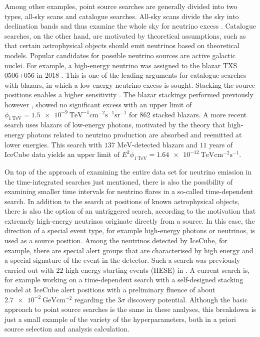 Among other examples, point source searches are generally divided into two types, all-sky scans and catalogue searches.
All-sky scans divide the sky into declination bands and thus examine the whole sky for neutrino excess \cite{all_sky_paper}.
Catalogue searches, on the other hand, are motivated by theoretical assumptions, such as that certain astrophysical objects should emit neutrinos based on theoretical models.
Popular candidates for possible neutrino sources are active galactic nuclei.
For example, a high-energy neutrino was assigned to the blazar TXS 0506+056 in 2018 \cite{txs}.
This is one of the leading arguments for catalogue searches with blazars, in which a low-energy neutrino excess is sought.
Stacking the source positions enables a higher sensitivity \cite{stacking_argument}.
The blazar stackings performed previously however \cite{blazar_stacking_2017}, showed no significant excess with an upper limit of $\phi_{\SI{1}{\tera\electronvolt}}=\SI{1.5e-9}{\tera\electronvolt\tothe{-1}\centi\meter\tothe{-2}\second\tothe{-1}\steradian\tothe{-1}}$ for $\num{862}$ stacked blazars.
A more recent search \cite{blazar_stacking_2020} uses blazars of low-energy photons, motivated by the theory that high-energy photons related to neutrino production are absorbed and reemitted at lower energies.
This search with $\num{137}$ $\si{\mega\electronvolt}$-detected blazars and $\num{11}$ years of IceCube data yields an upper limit of $E^2\phi_{\SI{1}{\tera\electronvolt}}=\SI{1.64e-12}{\tera\electronvolt\centi\meter\tothe{-2}\second\tothe{-1}}$.

On top of the approach of examining the entire data set for neutrino emission in the time-integrated searches just mentioned, there is also the possibility of examining smaller time intervals for neutrino flares in a so-called time-dependent search.
In addition to the search at positions of known astrophysical objects, there is also the option of an untriggered search, according to the motivation that extremely high-energy neutrinos originate directly from a source.
In this case, the direction of a special event type, for example high-energy photons or neutrinos, is used as a source position.
Among the neutrinos detected by IceCube, for example, there are special alert groups that are characterised by high energy and a special signature of the event in the detector.
Such a search was previously carried out with $\num{22}$ high energy starting events (HESE) in \cite{thorben}.
A current search is, for example \cite{martina} working on a time-dependent search with a self-designed stacking model at IceCube alert positions with a preliminary fluence of about $\SI{2.7e-2}{\giga\electronvolt\centi\meter\tothe{-2}}$ regarding the $\num{3}\sigma$ discovery potential.
Although the basic approach to point source searches is the same in these analyses, this breakdown is just a small example of the variety of the hyperparameters, both in a priori source selection and analysis calculation.

